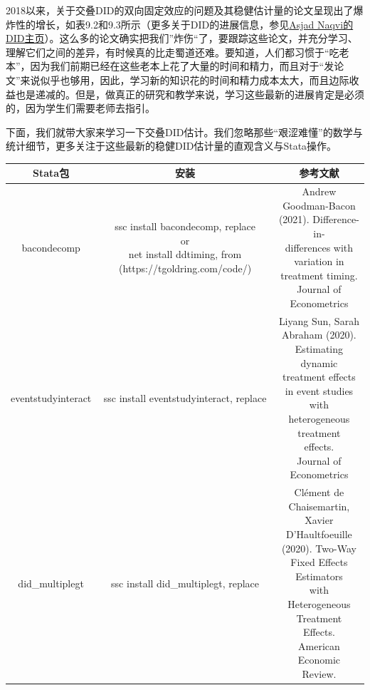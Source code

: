 \documentclass[cn,12pt,math=newtx,citestyle=gb7714-2015,bibstyle=gb7714-2015]{elegantbook}
\makeatletter
\newcommand{\tabincell}[2]{\begin{tabular}{@{}#1@{}}#2\end{tabular}}  %
\makeatother
\begin{document}
		2018以来，关于交叠DID的双向固定效应的问题及其稳健估计量的论文呈现出了爆炸性的增长，如表9.2和9.3所示（更多关于DID的进展信息，参见\href{https://asjadnaqvi.github.io/DiD/}{Asjad Naqvi的DID主页}）。这么多的论文确实把我们”炸伤“了，要跟踪这些论文，并充分学习、理解它们之间的差异，有时候真的比走蜀道还难。要知道，人们都习惯于“吃老本”，因为我们前期已经在这些老本上花了大量的时间和精力，而且对于“发论文”来说似乎也够用，因此，学习新的知识花的时间和精力成本太大，而且边际收益也是递减的。但是，做真正的研究和教学来说，学习这些最新的进展肯定是必须的，因为学生们需要老师去指引。
	
	下面，我们就带大家来学习一下交叠DID估计。我们忽略那些“艰涩难懂”的数学与统计细节，更多关注于这些最新的稳健DID估计量的直观含义与Stata操作。
	
	\begin{table}[htbp]
		\centering
		\caption{交叠DID的Stata包及对应文献}
		\begin{longtable}{|c|c|c|}
			\hline
			Stata包&安装  & 参考文献 \\
			\hline
			bacondecomp& \tabincell{c}{ ssc install bacondecomp, replace
				\\
				or
				\\
				net install ddtiming, from (https://tgoldring.com/code/)} & \tabincell{c}{ Andrew Goodman-Bacon\\(2021). Difference-in-\\differences with \\variation in \\treatment timing. \\Journal of Econometrics}\\
			\hline
			eventstudyinteract & ssc install eventstudyinteract, replace & \tabincell{c}{ Liyang Sun, Sarah \\Abraham (2020).\\ Estimating dynamic \\treatment effects\\ in event studies with\\ heterogeneous treatment \\effects. \\Journal of Econometrics}\\
			\hline
			did\_multiplegt &	ssc install did\_multiplegt, replace & \tabincell{c}{Clément de Chaisemartin,\\ Xavier D'Haultfoeuille \\(2020). Two-Way \\Fixed Effects Estimators \\with Heterogeneous \\Treatment Effects. \\American Economic \\Review.\\
}
\end{longtable}
\end{table}
\end{document}
